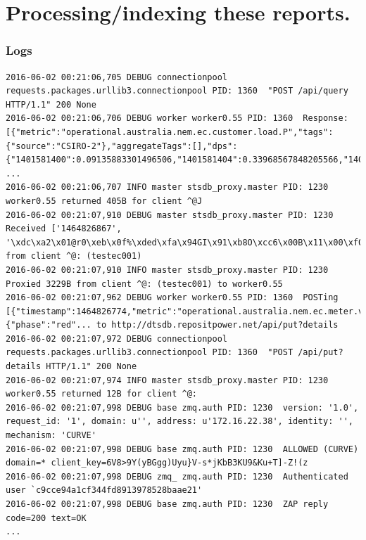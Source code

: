 \documentclass[13pt, ignorenonframetext]{beamer}
\begin{document}
\section{Processing/indexing these reports.}
\begin{frame}[fragile]
\frametitle{Logs}
\begin{verbatim}
2016-06-02 00:21:06,705 DEBUG connectionpool requests.packages.urllib3.connectionpool PID: 1360  "POST /api/query HTTP/1.1" 200 None
2016-06-02 00:21:06,706 DEBUG worker worker0.55 PID: 1360  Response: [{"metric":"operational.australia.nem.ec.customer.load.P","tags":{"source":"CSIRO-2"},"aggregateTags":[],"dps":{"1401581400":0.09135883301496506,"1401581404":0.33968567848205566,"1401581700":0.11657682061195374,"1401581704":0.3968915045261383,"1401582000": ...
2016-06-02 00:21:06,707 INFO master stsdb_proxy.master PID: 1230  worker0.55 returned 405B for client ^@J
2016-06-02 00:21:07,910 DEBUG master stsdb_proxy.master PID: 1230  Received ['1464826867', '\xdc\xa2\x01@r0\xeb\x0f%\xded\xfa\x94GI\x91\xb8O\xcc6\x00B\x11\x00\xf0N\x00\nwrite\x00\xcc\x04\x00Toperational.australia.nem.ec.meter.voltage\x02\xac\xee\xfb\xf4\n\x9a\x19{C\x02\nphase\x06red\x00\x00bonB\x00\x10inver\x01E,reques']... from client ^@: (testec001)
2016-06-02 00:21:07,910 INFO master stsdb_proxy.master PID: 1230  Proxied 3229B from client ^@: (testec001) to worker0.55
2016-06-02 00:21:07,962 DEBUG worker worker0.55 PID: 1360  POSTing [{"timestamp":1464826774,"metric":"operational.australia.nem.ec.meter.voltage","value":251.1000061035,"tags":{"phase":"red"... to http://dtsdb.repositpower.net/api/put?details
2016-06-02 00:21:07,972 DEBUG connectionpool requests.packages.urllib3.connectionpool PID: 1360  "POST /api/put?details HTTP/1.1" 200 None
2016-06-02 00:21:07,974 INFO master stsdb_proxy.master PID: 1230  worker0.55 returned 12B for client ^@:
2016-06-02 00:21:07,998 DEBUG base zmq.auth PID: 1230  version: '1.0', request_id: '1', domain: u'', address: u'172.16.22.38', identity: '', mechanism: 'CURVE'
2016-06-02 00:21:07,998 DEBUG base zmq.auth PID: 1230  ALLOWED (CURVE) domain=* client_key=6V8>9Y(yBGgg)Uyu}V-s*jKbB3KU9&Ku+T]-Z!(z
2016-06-02 00:21:07,998 DEBUG zmq_ zmq.auth PID: 1230  Authenticated user `c9cce94a1cf344fd8913978528baae21'
2016-06-02 00:21:07,998 DEBUG base zmq.auth PID: 1230  ZAP reply code=200 text=OK
...
\end{verbatim}
\end{frame}
\end{document}
